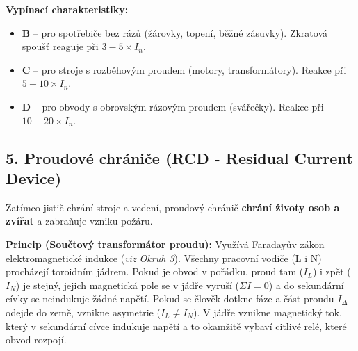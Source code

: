 \documentclass[a4paper,10pt]{article}
\begin{document}
\begin{vysvetlenibox}
\begin{center}
\end{center}

\textbf{Vypínací charakteristiky:}
\begin{itemize}
  \item \textbf{B} – pro spotřebiče bez rázů (žárovky, topení, běžné zásuvky). Zkratová spoušť reaguje při $3-5\times I_n$.
  \item \textbf{C} – pro stroje s rozběhovým proudem (motory, transformátory). Reakce při $5-10\times I_n$.
  \item \textbf{D} – pro obvody s obrovským rázovým proudem (svářečky). Reakce při $10-20\times I_n$.
\end{itemize}

\subsection*{5. Proudové chrániče (RCD - Residual Current Device)}

Zatímco jistič chrání stroje a vedení, proudový chránič \textbf{chrání životy osob a zvířat} a zabraňuje vzniku požáru.

\textbf{Princip (Součtový transformátor proudu):} Využívá Faradayův zákon elektromagnetické indukce (\textit{viz Okruh 3}). Všechny pracovní vodiče (L i N) procházejí toroidním jádrem. 
Pokud je obvod v pořádku, proud tam ($I_L$) i zpět ($I_N$) je stejný, jejich magnetická pole se v jádře vyruší ($\Sigma I = 0$) a do sekundární cívky se neindukuje žádné napětí.
Pokud se člověk dotkne fáze a část proudu $I_\Delta$ odejde do země, vznikne asymetrie ($I_L \neq I_N$). V jádře vznikne magnetický tok, který v sekundární cívce indukuje napětí a to okamžitě vybaví citlivé relé, které obvod rozpojí.

\begin{center}
\end{center}
\end{vysvetlenibox}
\end{document}

